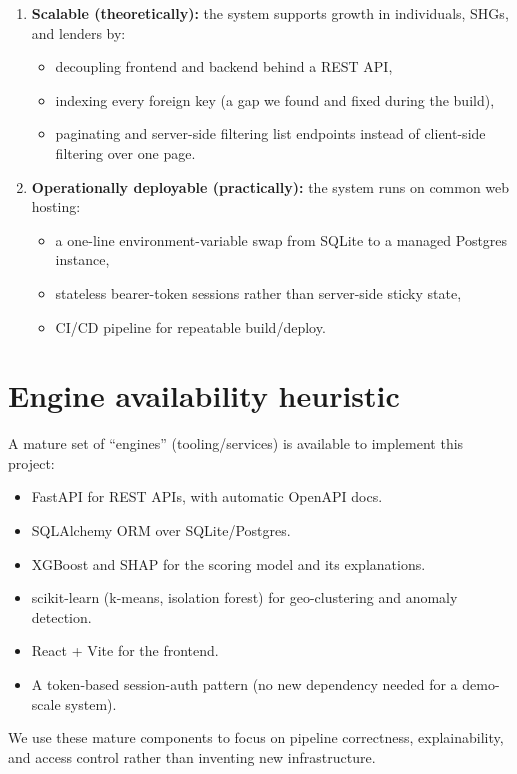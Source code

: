 \documentclass[11pt,a4paper]{article}
\begin{document}
\begin{enumerate}[leftmargin=0.7cm]
    \item \textbf{Scalable (theoretically):} the system
    supports growth in individuals, SHGs, and lenders by:
    \begin{itemize}[leftmargin=0.7cm]
        \item decoupling frontend and backend behind a
        REST API,
        \item indexing every foreign key (a gap we found
        and fixed during the build),
        \item paginating and server-side filtering list
        endpoints instead of client-side filtering over one
        page.
    \end{itemize}

    \item \textbf{Operationally deployable (practically):}
    the system runs on common web hosting:
    \begin{itemize}[leftmargin=0.7cm]
        \item a one-line environment-variable swap from
        SQLite to a managed Postgres instance,
        \item stateless bearer-token sessions rather than
        server-side sticky state,
        \item CI/CD pipeline for repeatable
        build/deploy.
    \end{itemize}
\end{enumerate}

\section{Engine availability heuristic}
A mature set of ``engines'' (tooling/services) is
available to implement this project:
\begin{itemize}[leftmargin=0.7cm]
    \item FastAPI for REST APIs, with automatic OpenAPI
    docs.
    \item SQLAlchemy ORM over SQLite/Postgres.
    \item XGBoost and SHAP for the scoring model and its
    explanations.
    \item scikit-learn (k-means, isolation forest) for
    geo-clustering and anomaly detection.
    \item React + Vite for the frontend.
    \item A token-based session-auth pattern (no new
    dependency needed for a demo-scale system).
\end{itemize}
We use these mature components to focus on pipeline
correctness, explainability, and access control rather
than inventing new infrastructure.
\end{document}
